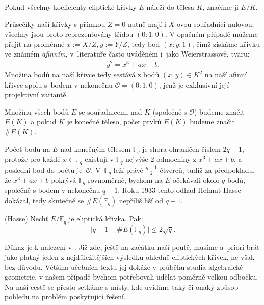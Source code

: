 \documentclass[12pt]{report}
\begin{document}
\begin{znaceni}
Pokud všechny koeficienty eliptické křivky $E$ náleží do tělesa $K$, značíme ji $E/K$.
\end{znaceni}


Průsečíky naší křivky s přímkou $Z=0$ nutně mají i $X$-ovou souřadnici nulovou, všechny jsou proto reprezentovány třídou $(0:1:0)$. V opačném případě můžeme přejít na proměnné $x := X/Z, y:= Y/Z$, tedy bod $(x:y:1)$, čímž získáme křivku ve známém \textit{afinním}, v~literatuře  často uváděném i~jako Weierstrassově, tvaru:
\begin{align*}
y^2 = x^3+ax+b.
\end{align*} 
Množina bodů na naší křivce tedy sestává z bodů $(x,y) \in K^2$ na naší afinní křivce spolu s~bodem v nekonečnu $\mathcal{O} = (0:1:0)$, jenž je exklusivní její projektivní variantě. 

\begin{znaceni}
Množinu všech bodů $E$ se souřadnicemi nad $K$ (společně s $\mathcal{O}$) budeme značit $E(K)$ a pokud $K$ je konečné těleso, počet prvků $E(K)$ budeme značit $\# E(K)$.
\end{znaceni}

Počet bodů na $E$ nad konečným tělesem $\mathbb{F}_q$ je shora ohraničen číslem $2q+1$, protože pro každé $x \in \mathbb{F}_q$ existují v $\mathbb{F}_q$ nejvýše $2$ odmocniny z $x^3+ax+b$, a poslední bod do počtu je~$\mathcal{O}$. V~$\mathbb{F}_q$ leží právě $\frac{q+1}{2}$ čtverců, tudíž za předpokladu, že $x^3+ax+b$ pokrývá $\mathbb{F}_q$ rovnoměrně, bychom na $E$ očekávali okolo $q$ bodů, společně s bodem v nekonečnu $q+1$. Roku 1933 tento odhad Helmut Hasse dokázal, tedy skutečně se $\# E(\mathbb{F}_q)$ nepříliš liší od $q+1$.
\begin{veta}(Hasse)\label{Hasse}
Nechť $E/\mathbb{F}_q$ je eliptická křivka. Pak:
\begin{equation*}
\vert q+1 - \# E(\mathbb{F}_q) \vert \leqslant 2\sqrt{q}.
\end{equation*}
\end{veta}
 Důkaz je k nalezení v \cite[Thm. V.1.1]{Silverman}. Již zde, ještě na začátku naší poutě, musíme a~priori brát jako platný jeden z nejdůležitějších výsledků ohledně eliptických křivek, ne však bez důvodu. Většina učebních textu jej dokáže v průběhu studia algebraické geometrie, v našem případě bychom potřebovali udělat poměrně velkou odbočku. Na naší cestě se přesto setkáme s místy, kde uvidíme taký či onaký způsob pohledu na problém poskytující řešení.
 
\end{document}
